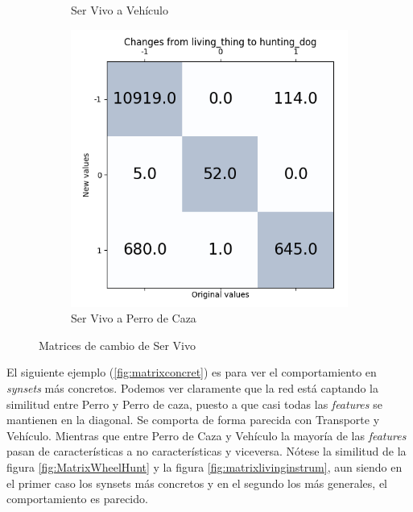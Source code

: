 \documentclass[12,twoside]{TFG-GM}
\theoremstyle{definition}
\theoremstyle{remark}
\begin{document}
\begin{figure}[ht]
\begin{subfigure}[b]{0.3\textwidth}
		\caption{Ser Vivo a Vehículo \label{fig:matrixlivingwheel}}
	\end{subfigure}
	\begin{subfigure}[b]{0.3\textwidth}
		\includegraphics[width=\textwidth]  {Images/plots/25/matrices/matrixLivingHunting.png}
		\caption{Ser Vivo a Perro de Caza \label{fig:matrixlivinghunting}}
	\end{subfigure}       
	\caption{Matrices de cambio de Ser Vivo \label{fig:matrixliving}}
\end{figure}

El siguiente ejemplo (\ref{fig:matrixconcret}) es para ver el comportamiento en \textit{synsets} más concretos. Podemos ver claramente que la red está captando la similitud entre Perro y Perro de caza, puesto a que casi todas las \textit{features} se mantienen en la diagonal. Se comporta de forma parecida con Transporte y Vehículo. Mientras que entre Perro de Caza y Vehículo la mayoría de las \textit{features} pasan de características a no características y viceversa. Nótese la similitud de la figura \ref{fig:MatrixWheelHunt} y la figura \ref{fig:matrixlivinginstrum}, aun siendo en el primer caso los synsets más concretos y en el segundo los más generales, el comportamiento es parecido.
\end{document}
